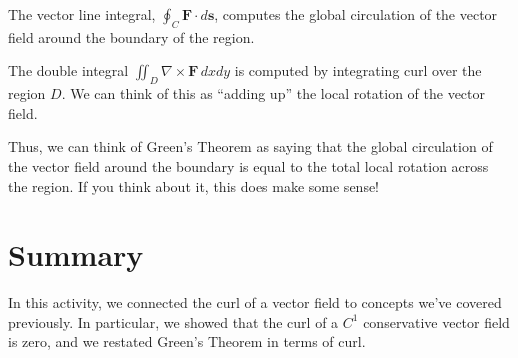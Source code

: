 \documentclass{ximera}
\begin{document}
The vector line integral, $\oint_C\mathbf{F}\cdot d\mathbf{s}$, computes the global circulation of the vector field around the boundary of the region.

The double integral $\iint_D\nabla\times\mathbf{F}\,dxdy$ is computed by integrating curl over the region $D$. We can think of this as ``adding up'' the local rotation of the vector field.

Thus, we can think of Green's Theorem as saying that the global circulation of the vector field around the boundary is equal to the total local rotation across the region. If you think about it, this does make some sense!

\section*{Summary}

In this activity, we connected the curl of a vector field to concepts we've covered previously. In particular, we showed that the curl of a $C^1$ conservative vector field is zero, and we restated Green's Theorem in terms of curl.
\end{document}
